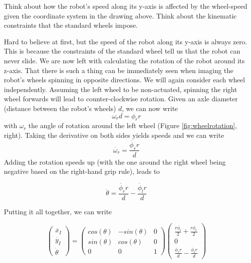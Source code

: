 \begin{framed}
Think about how the robot's speed along its y-axis is affected by the wheel-speed given the coordinate system in the drawing above. Think about the kinematic constraints that the standard wheels impose.
\end{framed}

Hard to believe at first, but the speed of the robot along its y-axis is always zero. This is because the constraints of the standard wheel tell us that the robot can never slide.  We are now left with calculating the rotation of the robot around its z-axis. That there is such a thing can be immediately seen when imaging the robot's wheels spinning in opposite directions. We will again consider each wheel independently. Assuming the left wheel to be non-actuated, spinning the right wheel forwards will lead to counter-clockwise rotation. Given an axle diameter (distance between the robot's wheels) $ d$, we can now write
\begin{equation}
\omega_r d = \phi_r r
\end{equation}
with $ \omega_r$ the angle of rotation around the left wheel (Figure \ref{fig:wheelrotation}, right). Taking the derivative on both sides yields speeds and we can write
\begin{equation}
\dot{\omega_r} = \frac{\dot{\phi_r} r}{d}
\end{equation}
Adding the rotation speeds up (with the one around the right wheel being negative based on the right-hand grip rule), leads to

\begin{equation}
\dot{\theta}=\frac{\dot{\phi_r} r}{d}-\frac{\dot{\phi_l} r}{d}
\end{equation}

Putting it all together, we can write

\begin{equation}\label{eq:diffwheels}
\left(\begin{array}{c} \dot{x_I}\\\dot{y_I}\\\dot{\theta}\end{array}\right)=\left(\begin{array}{ccc}
cos(\theta) & -sin(\theta) & 0 \\
sin(\theta) & cos(\theta) & 0 \\
0 & 0 & 1\end{array}\right)\left(\begin{array}{c}\frac{r\dot{\phi_l}}{2}+\frac{r\dot{\phi_r}}{2}\\0\\\frac{\dot{\phi_r} r}{d}-\frac{\dot{\phi_l} r}{d}\end{array}\right)
\end{equation}

